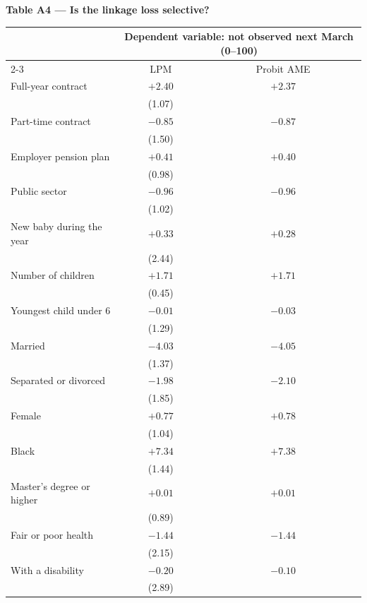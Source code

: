 \documentclass[11pt]{article}
\newcommand{\sym}[1]{\rlap{$^{#1}$}}
\begin{document}
\begin{center}
{\large\bfseries Table A4 --- Is the linkage loss selective?}\\[1.0em]
\begin{threeparttable}
\begin{tabular}{lcc}
\toprule
 & \multicolumn{2}{c}{Dependent variable: not observed next March (0--100)} \\
\cmidrule(lr){2-3}
 & LPM & Probit AME \\
\midrule
Full-year contract & $+2.40$\sym{**} & $+2.37$ \\
 & (1.07) & \\[0.2em]
Part-time contract & $-0.85$\sym{} & $-0.87$ \\
 & (1.50) & \\[0.2em]
Employer pension plan & $+0.41$\sym{} & $+0.40$ \\
 & (0.98) & \\[0.2em]
Public sector & $-0.96$\sym{} & $-0.96$ \\
 & (1.02) & \\[0.2em]
New baby during the year & $+0.33$\sym{} & $+0.28$ \\
 & (2.44) & \\[0.2em]
Number of children & $+1.71$\sym{***} & $+1.71$ \\
 & (0.45) & \\[0.2em]
Youngest child under 6 & $-0.01$\sym{} & $-0.03$ \\
 & (1.29) & \\[0.2em]
Married & $-4.03$\sym{***} & $-4.05$ \\
 & (1.37) & \\[0.2em]
Separated or divorced & $-1.98$\sym{} & $-2.10$ \\
 & (1.85) & \\[0.2em]
Female & $+0.77$\sym{} & $+0.78$ \\
 & (1.04) & \\[0.2em]
Black & $+7.34$\sym{***} & $+7.38$ \\
 & (1.44) & \\[0.2em]
Master's degree or higher & $+0.01$\sym{} & $+0.01$ \\
 & (0.89) & \\[0.2em]
Fair or poor health & $-1.44$\sym{} & $-1.44$ \\
 & (2.15) & \\[0.2em]
With a disability & $-0.20$\sym{} & $-0.10$ \\
 & (2.89) & \\[0.2em]

\end{tabular}
\end{threeparttable}
\end{center}
\end{document}
